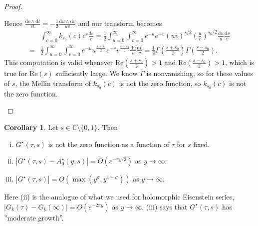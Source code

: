 \documentclass{article}
\theoremstyle{definition}
\newtheorem{cor}[theorem]{Corollary}
\begin{document}
\begin{proof}
\begin{enumerate}[(1)]
        Hence $\frac{\mathrm{d}c \wedge \mathrm{d}t}{ct} = -\frac{1}{2}\frac{\mathrm{d}u \wedge \mathrm{d}v}{uv}$ and our transform becomes
        \begin{align*}
             &\int_{c=0}^{\infty} k_{s_0}(c)c^s \frac{\mathrm{d}c}{c} = \frac{1}{2}\int_{u=0}^{\infty} \int_{v=0}^{\infty} e^{-u}e^{-v} (uv)^{s/2} \left(\frac{u}{v}\right)^{s_0/2}\frac{\mathrm{d}u}{u}\frac{\mathrm{d}v}{v} \\
            =& \frac{1}{2}\int_{u=0}^{\infty} \int_{v=0}^{\infty} e^{-u}u^{\frac{s+s_0}{2}}e^{-v}v^{\frac{s-s_0}{2}}\frac{\mathrm{d}u}{u}\frac{\mathrm{d}v}{v} = \frac{1}{2}\Gamma \left(\frac{s+s_0}{2}\right) \Gamma \left(\frac{s-s_0}{2}\right).
        \end{align*}
        This computation is valid whenever $\text{Re}\left(\frac{s+s_0}{2}\right)>1$ and $\text{Re}\left(\frac{s-s_0}{2}\right) > 1$, which is true for $\text{Re}(s)$ sufficiently large. We know $\Gamma$ is nonvanishing, so for these values of $s$, the Mellin transform of $k_{s_0}(c)$ is not the zero function, so $k_{s_0}(c)$ is not the zero function.
    \end{enumerate}
\end{proof}
\begin{cor}\label{cor6.6}
    Let $s \in \mathbb{C} \setminus \{0,1\}$. Then
    \begin{enumerate}[(i)]
        \item $G^\star(\tau, s)$ is not the zero function as a function of $\tau$ for $s$ fixed.
        \item $|G^\star(\tau,s)-A_0^\star(y,s)| = O(e^{-\pi y/2})$ as $y \to \infty$.
        \item $|G^{\star}(\tau,s)| = O(\max(y^{\sigma},y^{1-\sigma}))$ as $y \to \infty$.
    \end{enumerate}
\end{cor}
Here (ii) is the analogue of what we used for holomorphic Eisenstein series, $|G_k(\tau)-G_k(\infty)| = O(e^{-2\pi y})$ as $y \to \infty$. (iii) says that $G^{\star}(\tau,s)$ has ''moderate growth''.
\end{document}
